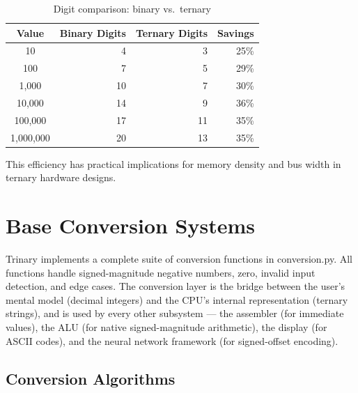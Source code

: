 \documentclass[12pt,a4paper,twoside]{book}
\theoremstyle{trinarytheorem}
\theoremstyle{trinarydefinition}
\newcommand{\code}[1]{\textsf{#1}}
\begin{document}
\begin{table}[H]
\centering
\caption{Digit comparison: binary vs.\ ternary}
\label{tab:digits}
\begin{tabular}{crrr}
\toprule
Value & Binary Digits & Ternary Digits & Savings \\
\midrule
10     & 4  & 3  & 25\% \\
100    & 7  & 5  & 29\% \\
1,000  & 10 & 7  & 30\% \\
10,000 & 14 & 9  & 36\% \\
100,000 & 17 & 11 & 35\% \\
1,000,000 & 20 & 13 & 35\% \\
\bottomrule
\end{tabular}
\end{table}

This efficiency has practical implications for memory density and bus width in ternary
hardware designs.

\chapter{Base Conversion Systems}
\label{ch:conversion}

Trinary implements a complete suite of conversion functions in \code{conversion.py}.
All functions handle signed-magnitude negative numbers, zero, invalid input detection,
and edge cases. The conversion layer is the bridge between the user's mental model
(decimal integers) and the CPU's internal representation (ternary strings), and is
used by every other subsystem --- the assembler (for immediate values), the ALU (for
native signed-magnitude arithmetic), the display (for ASCII codes), and the neural network
framework (for signed-offset encoding).

\section{Conversion Algorithms}
\end{document}
